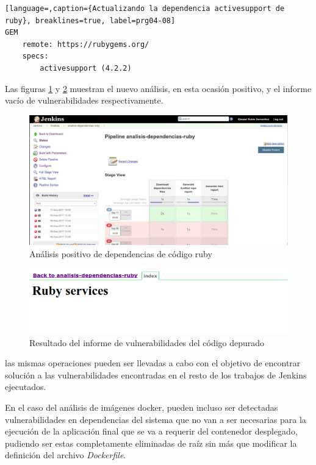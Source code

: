\begin{lstlisting}[language=,caption={Actualizando la dependencia activesupport de ruby}, breaklines=true, label=prg04-08]
GEM
	remote: https://rubygems.org/
	specs:
		activesupport (4.2.2)
\end{lstlisting}

Las figuras \ref{ruby_05} y \ref{ruby_06} muestran el nuevo análisis, en esta ocasión positivo, y el informe vacío de vulnerabilidades respectivamente.

\begin{figure}[H]
	\centering
	\includegraphics[width=0.90\linewidth]
	{desarrollo/figuras/ruby_05.png}
	\caption{Análisis positivo de dependencias de código ruby}
	\label{ruby_05}
\end{figure}

\begin{figure}[H]
	\centering
	\includegraphics[width=0.90\linewidth]
	{desarrollo/figuras/ruby_06.png}
	\caption{Resultado del informe de vulnerabilidades del código depurado}
	\label{ruby_06}
\end{figure}

las mismas operaciones pueden ser llevadas a cabo con el objetivo de encontrar solución a las vulnerabilidades encontradas en el resto de los trabajos de Jenkins ejecutados. 

En el caso del análisis de imágenes docker, pueden incluso ser detectadas vulnerabilidades en dependencias del sistema que no van a ser necesarias para la ejecución de la aplicación final que se va a requerir del contenedor desplegado, pudiendo ser estas completamente eliminadas de raíz sin más que modificar la definición del archivo \textit{Dockerfile}.

